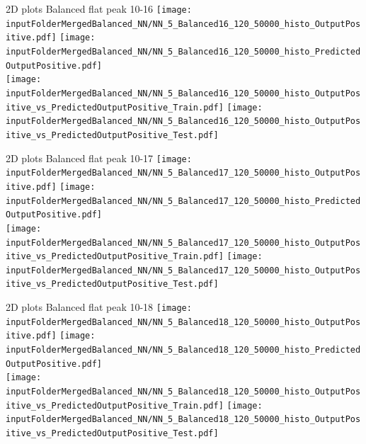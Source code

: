 \documentclass{beamer}
\begin{document}
\begin{frame}{2D plots Balanced flat peak 10-16}
\texttt{[image: \\inputFolderMergedBalanced\_NN/NN\_5\_Balanced16\_120\_50000\_histo\_OutputPositive.pdf]}
\texttt{[image: \\inputFolderMergedBalanced\_NN/NN\_5\_Balanced16\_120\_50000\_histo\_PredictedOutputPositive.pdf]}\\
\texttt{[image: \\inputFolderMergedBalanced\_NN/NN\_5\_Balanced16\_120\_50000\_histo\_OutputPositive\_vs\_PredictedOutputPositive\_Train.pdf]}
\texttt{[image: \\inputFolderMergedBalanced\_NN/NN\_5\_Balanced16\_120\_50000\_histo\_OutputPositive\_vs\_PredictedOutputPositive\_Test.pdf]}
\end{frame}
\clearpage

\begin{frame}{2D plots Balanced flat peak 10-17}
\texttt{[image: \\inputFolderMergedBalanced\_NN/NN\_5\_Balanced17\_120\_50000\_histo\_OutputPositive.pdf]}
\texttt{[image: \\inputFolderMergedBalanced\_NN/NN\_5\_Balanced17\_120\_50000\_histo\_PredictedOutputPositive.pdf]}\\
\texttt{[image: \\inputFolderMergedBalanced\_NN/NN\_5\_Balanced17\_120\_50000\_histo\_OutputPositive\_vs\_PredictedOutputPositive\_Train.pdf]}
\texttt{[image: \\inputFolderMergedBalanced\_NN/NN\_5\_Balanced17\_120\_50000\_histo\_OutputPositive\_vs\_PredictedOutputPositive\_Test.pdf]}
\end{frame}
\clearpage

\begin{frame}{2D plots Balanced flat peak 10-18}
\texttt{[image: \\inputFolderMergedBalanced\_NN/NN\_5\_Balanced18\_120\_50000\_histo\_OutputPositive.pdf]}
\texttt{[image: \\inputFolderMergedBalanced\_NN/NN\_5\_Balanced18\_120\_50000\_histo\_PredictedOutputPositive.pdf]}\\
\texttt{[image: \\inputFolderMergedBalanced\_NN/NN\_5\_Balanced18\_120\_50000\_histo\_OutputPositive\_vs\_PredictedOutputPositive\_Train.pdf]}
\texttt{[image: \\inputFolderMergedBalanced\_NN/NN\_5\_Balanced18\_120\_50000\_histo\_OutputPositive\_vs\_PredictedOutputPositive\_Test.pdf]}
\end{frame}
\clearpage
\end{document}
